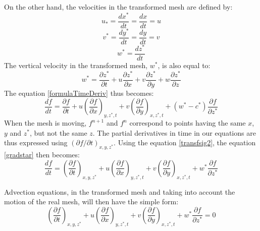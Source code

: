 On the other hand, the velocities in the transformed mesh are defined by:
\begin{equation}
u_{\ast}=\dfrac{dx^{\ast}}{dt}=\dfrac{dx}{dt}=u
\end{equation}
%
\begin{equation}
v^{\ast}=\dfrac{dy^{\ast}}{dt}=\dfrac{dy}{dt}=v
\end{equation}
%
\begin{equation}
w^{\ast}=\dfrac{dz^{\ast}}{dt}%
\end{equation}
The vertical velocity in the transformed mesh, $w^*$, is also equal to:%
\begin{equation}
w^{\ast}=\dfrac{\partial z^{\ast}}{\partial t}
+u\dfrac{\partial z^{\ast}}{\partial x}
+v\dfrac{\partial z^{\ast}}{\partial y}
+w\dfrac{\partial z^{\ast}}{\partial z} \label{wetoile}%
\end{equation}
The equation \eqref{formulaTimeDeriv} thus becomes:%
\begin{equation}
\dfrac{df}{dt}=\dfrac{\partial f}{\partial t}
+u\left(\dfrac{\partial f}{\partial x}\right)_{y,z^*,t}
+v\left(\dfrac{\partial f}{\partial y}\right)_{x,z^*,t}
+(w^{\ast}-c^{\ast})\dfrac{\partial f}{\partial z^{\ast}}
\label{gradstar}%
\end{equation}
When the mesh is moving, $f^{n+1}$ and $f^{n}$ correspond to points having the same $x$, $y $
and $z^{\ast}$, but not the same $z$. The partial derivatives in time in our
equations are thus expressed using $\left(\partial f/\partial t\right)_{x,y,z^{\ast}}$.
Using the equation \eqref{transfsig2}, the equation \eqref{gradstar} then becomes:%
\begin{equation}
\dfrac{df}{dt}=\left(\dfrac{\partial f}{\partial t}\right)_{x,y,z^{\ast}}
+u\left(\dfrac{\partial f}{\partial x}\right)_{y,z^*,t}
+v\left(\dfrac{\partial f}{\partial y}\right)_{x,z^*,t}
+w^{\ast}\dfrac{\partial f}{\partial z^{\ast}}
\end{equation}

Advection equations, in the transformed mesh and taking into account the
motion of the real mesh, will then have the simple form:%
\begin{equation}
\left(\dfrac{\partial f}{\partial t}\right)_{x,y,z^{\ast}}
+u\left(\dfrac{\partial f}{\partial x}\right)_{y,z^*,t}
+v\left(\dfrac{\partial f}{\partial y}\right)_{x,z^*,t}
+w^{\ast}\dfrac{\partial f}{\partial z^{\ast}}=0 \label{advectioninfixedmesh}%
\end{equation}

